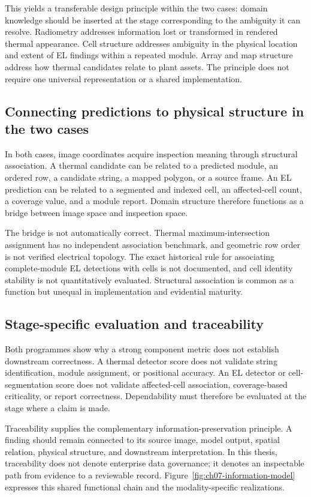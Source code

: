 \documentclass[12pt,a4paper]{report}
\begin{document}
This yields a transferable design principle within the two cases: domain knowledge should be inserted at the stage corresponding to the ambiguity it can resolve. Radiometry addresses information lost or transformed in rendered thermal appearance. Cell structure addresses ambiguity in the physical location and extent of EL findings within a repeated module. Array and map structure address how thermal candidates relate to plant assets. The principle does not require one universal representation or a shared implementation.

\subsection{Connecting predictions to physical structure in the two cases}

In both cases, image coordinates acquire inspection meaning through structural association. A thermal candidate can be related to a predicted module, an ordered row, a candidate string, a mapped polygon, or a source frame. An EL prediction can be related to a segmented and indexed cell, an affected-cell count, a coverage value, and a module report. Domain structure therefore functions as a bridge between image space and inspection space.

The bridge is not automatically correct. Thermal maximum-intersection assignment has no independent association benchmark, and geometric row order is not verified electrical topology. The exact historical rule for associating complete-module EL detections with cells is not documented, and cell identity stability is not quantitatively evaluated. Structural association is common as a function but unequal in implementation and evidential maturity.

\subsection{Stage-specific evaluation and traceability}

Both programmes show why a strong component metric does not establish downstream correctness. A thermal detector score does not validate string identification, module assignment, or positional accuracy. An EL detector or cell-segmentation score does not validate affected-cell association, coverage-based criticality, or report correctness. Dependability must therefore be evaluated at the stage where a claim is made.

Traceability supplies the complementary information-preservation principle. A finding should remain connected to its source image, model output, spatial relation, physical structure, and downstream interpretation. In this thesis, traceability does not denote enterprise data governance; it denotes an inspectable path from evidence to a reviewable record. Figure~\ref{fig:ch07-information-model} expresses this shared functional chain and the modality-specific realizations.
\end{document}
